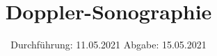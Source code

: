 

\subject{US3}
\title{Doppler-Sonographie}
\date{%
  Durchführung: 11.05.2021
  \hspace{3em}
  Abgabe: 15.05.2021
}



\maketitle
\thispagestyle{empty}
\tableofcontents
\newpage






\printbibliography{}


